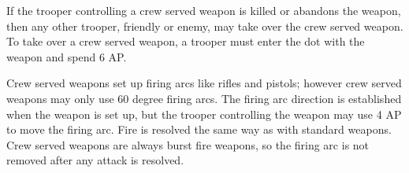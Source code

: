 If the trooper controlling a crew served weapon is killed or abandons the weapon, then any other trooper, friendly or enemy, may take over the crew served weapon.
To take over a crew served weapon, a trooper must enter the dot with the weapon and spend 6 AP.

Crew served weapons set up firing arcs like rifles and pistols; however crew served weapons may only use 60 degree firing arcs.
The firing arc direction is established when the weapon is set up, but the trooper controlling the weapon may use 4 AP to move the firing arc.
Fire is resolved the same way as with standard weapons.
Crew served weapons are always burst fire weapons, so the firing arc is not removed after any attack is resolved.

